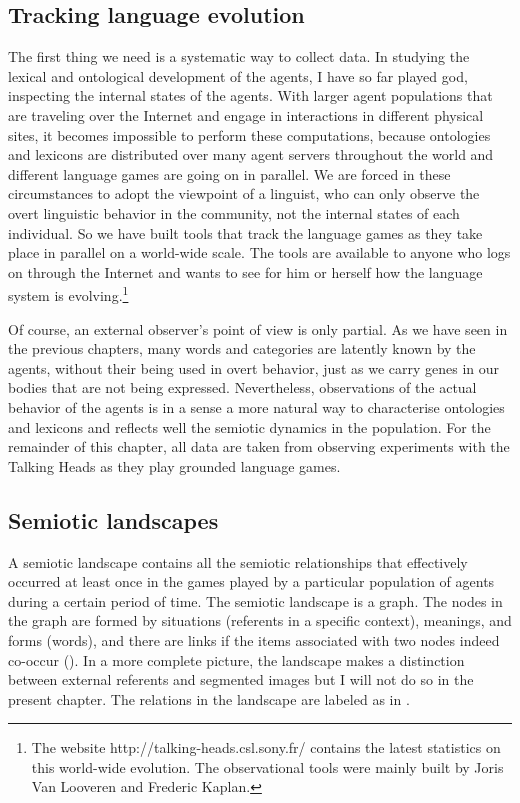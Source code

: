 \subsection{Tracking language evolution}

The first thing we need is a systematic
way to collect data. In studying the lexical 
and ontological development 
of the agents, I have so far played god, inspecting 
the internal states of the agents. With larger agent
populations that 
are traveling over the Internet and engage in interactions in 
different physical sites, it becomes impossible
to perform these computations, because ontologies and 
lexicons are distributed over many agent servers
throughout the world and different language games are
going on in parallel. We 
are forced in these circumstances to adopt the
viewpoint of a linguist, who
can only observe the overt linguistic behavior in the community,
not the internal states of each individual. 
So we have built tools that track the language games 
as they take place in parallel on a world-wide scale. The tools 
are available to anyone who logs on through the Internet
and wants to see for him or herself how the language
system is evolving.\footnote{The website http://talking-heads.csl.sony.fr/ 
contains the latest statistics on this world-wide evolution. 
The observational tools were mainly built by Joris Van 
Looveren and Frederic Kaplan.}

Of course, an external observer's
point of view is only partial. As we have seen in the
previous chapters, many 
words and categories are latently known by the agents, 
without their being used in overt behavior, just as 
we carry genes in our bodies that are not 
being expressed. Nevertheless, 
observations of the actual behavior of the agents is
in a sense a more natural way to characterise 
ontologies and lexicons and reflects well the
semiotic dynamics in the population. For the remainder
of this chapter, all data
are taken from observing experiments with the Talking Heads as
they play grounded language games. 

\subsection{Semiotic landscapes}

A semiotic landscape contains all the semiotic relationships
that effectively occurred at least once
in the games played by a particular population of agents
during a certain period of time. 
The semiotic landscape is a graph. The nodes in the
graph are formed by situations (referents in a specific context), 
meanings, and forms (words),
and there are links if the items associated with two nodes
indeed co-occur (). In a more complete
picture, the landscape makes a distinction between 
external referents and segmented images but I will not 
do so in the present chapter. The relations in the landscape are labeled as in .

